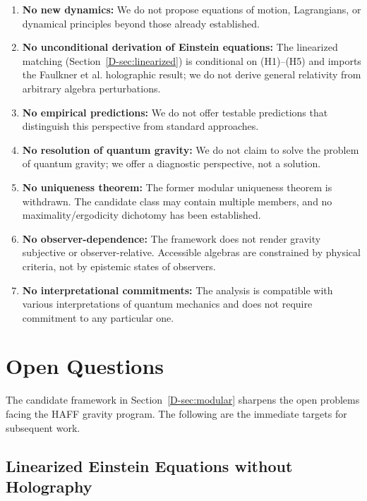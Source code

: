 \documentclass[12pt,a4paper,openany]{book}
\begin{document}
\begin{enumerate}
    \item \textbf{No new dynamics:} We do not propose equations of motion, Lagrangians, or dynamical principles beyond those already established.
    
    \item \textbf{No unconditional derivation of Einstein equations:} The linearized matching (Section~\ref{D-sec:linearized}) is conditional on (H1)--(H5) and imports the Faulkner et al. holographic result; we do not derive general relativity from arbitrary algebra perturbations.
    
    \item \textbf{No empirical predictions:} We do not offer testable predictions that distinguish this perspective from standard approaches.
    
    \item \textbf{No resolution of quantum gravity:} We do not claim to solve the problem of quantum gravity; we offer a diagnostic perspective, not a solution.

    \item \textbf{No uniqueness theorem:} The former modular uniqueness theorem is withdrawn.  The candidate class may contain multiple members, and no maximality/ergodicity dichotomy has been established.
    
    \item \textbf{No observer-dependence:} The framework does not render gravity subjective or observer-relative. Accessible algebras are constrained by physical criteria, not by epistemic states of observers.
    
    \item \textbf{No interpretational commitments:} The analysis is compatible with various interpretations of quantum mechanics and does not require commitment to any particular one.
\end{enumerate}

\section{Open Questions}
\label{D-sec:open}

The candidate framework in Section~\ref{D-sec:modular} sharpens the open problems facing the HAFF gravity program. The following are the immediate targets for subsequent work.

\subsection{Linearized Einstein Equations without Holography}
\end{document}
